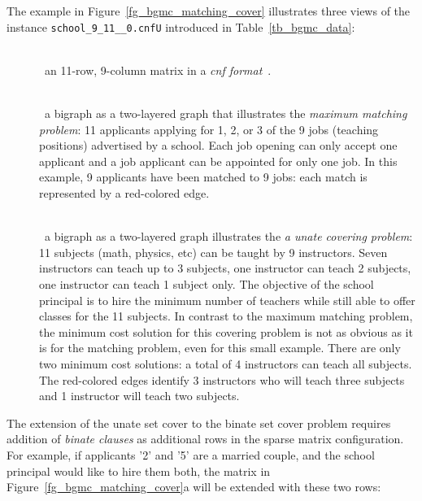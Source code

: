 

The example in Figure~\ref{fg_bgmc_matching_cover} illustrates 
three views of the
instance  {\tt school\_9\_11\_\_0.cnfU} 
introduced in Table~\ref{tb_bgmc_data}: 

\begin{description}

\item[]~\\\
an 11-row, 9-column  %
matrix in a {\it cnf format}~\cite{OPUS-cnf-2021-wiki}.


\item[]~\\\
a bigraph as a two-layered graph 
that illustrates the {\em maximum matching problem}:
11 applicants applying for  1, 2, or 3 of the
9 jobs (teaching positions)  advertised by a school.
Each job opening can only accept one applicant and a 
job applicant can be appointed for only one job. 
In this example, 9 applicants have been matched to 9 jobs:
each match is represented by a red-colored edge.

\item[]~\\\
a bigraph as a two-layered graph 
illustrates the  {\it a unate covering problem}:
11 subjects (math, physics, etc)  can be taught by 9 instructors.
Seven instructors can teach up to 3 subjects, one instructor can
teach 2 subjects, one instructor can teach 1 subject only.
The objective of the school principal is to hire the minimum
number of teachers while still able to offer classes 
for the 11 subjects. In contrast to the maximum matching problem,
the minimum cost solution for this
covering problem is not as obvious as it is for the matching problem,
even for this small example.
There are only two minimum cost solutions: a total of  4
instructors can teach all subjects. The red-colored edges 
identify 3 instructors who will teach three
subjects and 1 instructor will teach two subjects.

\end{description}

The extension of the unate set cover to the binate set cover
problem requires addition of {\it binate clauses} as
additional rows in the sparse matrix configuration.
For example, if applicants '2' and '5' are a married couple,
and the school principal would like to hire them both,
the matrix in Figure~\ref{fg_bgmc_matching_cover}a 
will be extended with these two rows:
\\[2.5ex]
\hspace*{14ex}{\tt -2 ~~~5}\\
\hspace*{14ex}{\tt ~2 ~~-5}


